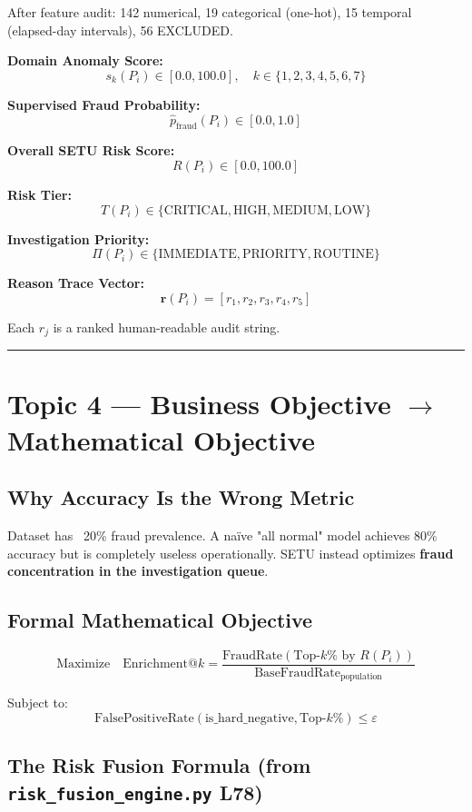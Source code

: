 \documentclass[11pt,a4paper]{article}
\begin{document}
After feature audit: 142 numerical, 19 categorical (one-hot), 15 temporal (elapsed-day intervals), 56 EXCLUDED.

\textbf{Domain Anomaly Score:}
\[ s_k(P_i) \in [0.0, 100.0], \quad k \in \{1, 2, 3, 4, 5, 6, 7\} \]

\textbf{Supervised Fraud Probability:}
\[ \hat{p}_\text{fraud}(P_i) \in [0.0, 1.0] \]

\textbf{Overall SETU Risk Score:}
\[ R(P_i) \in [0.0, 100.0] \]

\textbf{Risk Tier:}
\[ T(P_i) \in \{\text{CRITICAL}, \text{HIGH}, \text{MEDIUM}, \text{LOW}\} \]

\textbf{Investigation Priority:}
\[ \Pi(P_i) \in \{\text{IMMEDIATE}, \text{PRIORITY}, \text{ROUTINE}\} \]

\textbf{Reason Trace Vector:}
\[ \mathbf{r}(P_i) = [r_1, r_2, r_3, r_4, r_5] \]

Each $r_j$ is a ranked human-readable audit string.

\vspace{1em}\hrule\vspace{1em}

\section{Topic 4 --- Business Objective $\rightarrow$ Mathematical Objective}

\subsection{Why Accuracy Is the Wrong Metric}

Dataset has ~20\% fraud prevalence. A naïve "all normal" model achieves 80\% accuracy but is completely useless operationally. SETU instead optimizes \textbf{fraud concentration in the investigation queue}.

\subsection{Formal Mathematical Objective}

\[ \text{Maximize} \quad \text{Enrichment@}k = \frac{\text{FraudRate}(\text{Top-}k\% \text{ by } R(P_i))}{\text{BaseFraudRate}_\text{population}} \]

Subject to:
\[ \text{FalsePositiveRate}(\text{is\_hard\_negative}, \text{Top-}k\%) \leq \varepsilon \]

\subsection{The Risk Fusion Formula (from \texttt{risk\_fusion\_engine.py} L78)}
\end{document}
